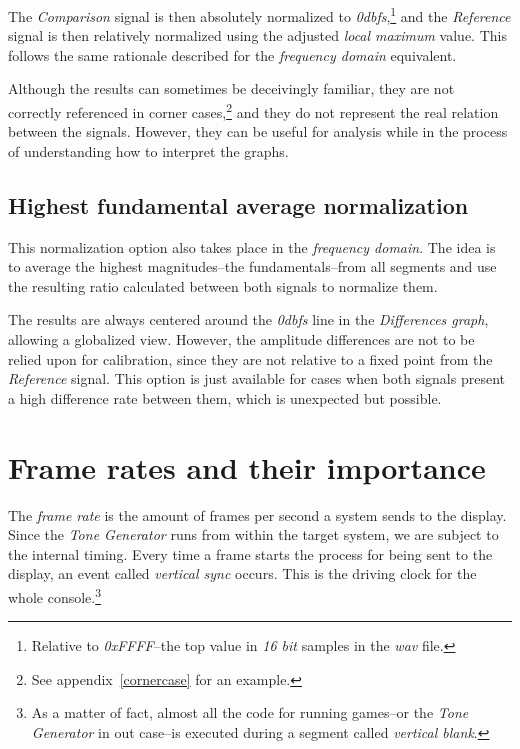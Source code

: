\documentclass[10pt,a4paper]{report}
\newcommand{\ac}[1]{\textit{\mbox{\acrshort{#1}}}}
\newcommand{\db}[1]{\textit{\mbox{#1\acrshort{dbfs}}}}
\begin{document}
\begin{appendices}
The \textit{Comparison} signal is then absolutely normalized to \db{0},\footnote{Relative to \textit{0xFFFF}--the top value in \textit{16 bit} samples in the \ac{wav} file.} and the \textit{Reference} signal is then relatively normalized using the adjusted \textit{local maximum} value. This follows the same rationale described for the \textit{frequency domain} equivalent.

Although the results can sometimes be deceivingly familiar, they are not correctly referenced in corner cases,\footnote{See appendix~\ref{cornercase} for an example.} and they do not represent the real relation between the signals. However, they can be useful for analysis while in the process of understanding how to interpret the graphs.

\section{Highest fundamental average normalization}

This normalization option also takes place in the \textit{frequency domain}. The idea is to average the highest magnitudes--the fundamentals--from all segments and use the resulting ratio calculated between both signals to normalize them.

The results are always centered around the \db{0} line in the \textit{Differences graph}, allowing a globalized view. However, the amplitude differences are not to be relied upon for calibration, since they are not relative to a fixed point from the \textit{Reference} signal. This option is just available for cases when both signals present a high difference rate between them, which is unexpected but possible.

\chapter{Frame rates and their importance}
\label{framerate}

The \textit{frame rate} is the amount of frames per second a system sends to the display. Since the \textit{Tone Generator} runs from within the target system, we are subject to the internal timing. Every time a frame starts the process for being sent to the display, an event called \textit{vertical sync} occurs. This is the driving clock for the whole console.\footnote{As a matter of fact, almost all the code for running games--or the \textit{Tone Generator} in out case--is executed during a segment called \textit{vertical blank}.}


\end{appendices}
\end{document}
